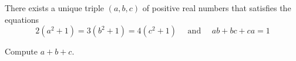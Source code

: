 There exists a unique triple $(a, b, c)$ of positive real numbers that satisfies the equations
$$
2\left(a^{2}+1\right)=3\left(b^{2}+1\right)=4\left(c^{2}+1\right) \quad \text { and } \quad a b+b c+c a=1
$$

Compute $a+b+c$.